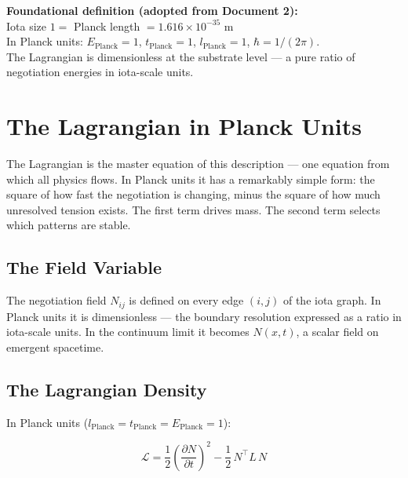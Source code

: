 \documentclass[11pt,letterpaper]{article}
\newenvironment{plainbox}{\begin{tcolorbox}[colback=blue!3!white,colframe=blue!40!white,title={\small\textit{In plain language}},breakable]}{\end{tcolorbox}}
\newenvironment{defbox}{\begin{tcolorbox}[colback=green!3!white,colframe=green!45!black,title={\small\textit{Foundational definition}},breakable]}{\end{tcolorbox}}
\begin{document}
\begin{defbox}
\textbf{Foundational definition (adopted from Document 2):}\\[4pt]
Iota size $1 =$ Planck length $= 1.616 \times 10^{-35}$ m\\[4pt]
In Planck units: $E_\text{Planck} = 1$, $t_\text{Planck} = 1$, $l_\text{Planck} = 1$, $\hbar = 1/(2\pi)$.\\[4pt]
The Lagrangian is dimensionless at the substrate level --- a pure ratio of negotiation energies in iota-scale units.
\end{defbox}

\section{The Lagrangian in Planck Units}
\label{sec:orgee2c750}

\begin{plainbox}
The Lagrangian is the master equation of this description --- one equation from which all physics flows. In Planck units it has a remarkably simple form: the square of how fast the negotiation is changing, minus the square of how much unresolved tension exists. The first term drives mass. The second term selects which patterns are stable.
\end{plainbox}

\subsection{The Field Variable}
\label{sec:org474a340}

The negotiation field \(N_{ij}\) is defined on every edge \((i,j)\) of the iota graph. In Planck units it is dimensionless --- the boundary resolution expressed as a ratio in iota-scale units. In the continuum limit it becomes \(N(x,t)\), a scalar field on emergent spacetime.

\subsection{The Lagrangian Density}
\label{sec:org9947173}

In Planck units (\(l_\text{Planck} = t_\text{Planck} = E_\text{Planck} = 1\)):

\begin{equation}
\boxed{\mathcal{L} = \frac{1}{2}\!\left(\frac{\partial N}{\partial t}\right)^{\!2} - \frac{1}{2}\,N^\top L\, N}
\end{equation}
\end{document}
